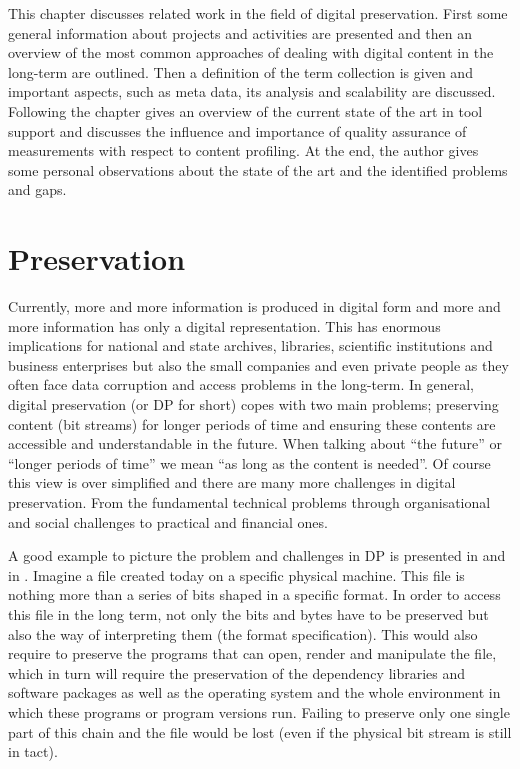 This chapter discusses related work in the field of digital preservation. First some general information about projects and activities are presented and then an overview of the most common approaches of dealing with digital content in the long-term are outlined. Then a definition of the term collection is given and important aspects, such as meta data, its analysis and scalability are discussed. Following the chapter gives an overview of the current state of the art in tool support and discusses the influence and importance of quality assurance of measurements with respect to content profiling. At the end, the author gives some personal observations about the state of the art and the identified problems and gaps.

\section{Preservation}
Currently, more and more information is produced in digital form and more and more information has only a digital representation. This has enormous implications for national and state archives, libraries, scientific institutions and business enterprises but also the small companies and even private people as they often face data corruption and access problems in the long-term.
In general, digital preservation (or DP for short) copes with two main problems; preserving content (bit streams) for longer periods of time and ensuring these contents are accessible and understandable in the future. When talking about ``the future'' or ``longer periods of time'' we mean ``as long as the content is needed''.
Of course this view is over simplified and there are many more challenges in digital preservation. From the fundamental technical problems through organisational and social challenges to practical and financial ones.

A good example to picture the problem and challenges in DP is presented in \cite{Lorie:2001:LTP:379437.379726} and in \cite{Rauber:2009:dpchallenges}. Imagine a file created today on a specific physical machine. This file is nothing more than a series of bits shaped in a specific format. In order to access this file in the long term, not only the bits and bytes have to be preserved but also the way of interpreting them (the format specification). This would also require to preserve the programs that can open, render and manipulate the file, which in turn will require the preservation of the dependency libraries and software packages as well as the operating system and the whole environment in which these programs or program versions run. Failing to preserve only one single part of this chain and the file would be lost (even if the physical bit stream is still in tact).

